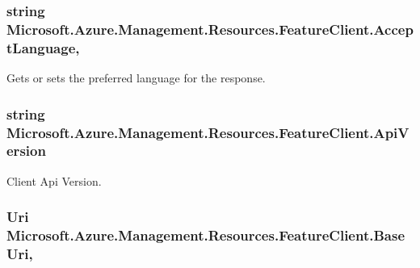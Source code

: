 \subsubsection[{\texorpdfstring{Accept\+Language}{AcceptLanguage}}]{\setlength{\rightskip}{0pt plus 5cm}string Microsoft.\+Azure.\+Management.\+Resources.\+Feature\+Client.\+Accept\+Language\hspace{0.3cm}{\ttfamily [get]}, {\ttfamily [set]}}\hypertarget{class_microsoft_1_1_azure_1_1_management_1_1_resources_1_1_feature_client_a12c737e4db1139025734fddc6e609dbd}{}\label{class_microsoft_1_1_azure_1_1_management_1_1_resources_1_1_feature_client_a12c737e4db1139025734fddc6e609dbd}


Gets or sets the preferred language for the response. 

\subsubsection[{\texorpdfstring{Api\+Version}{ApiVersion}}]{\setlength{\rightskip}{0pt plus 5cm}string Microsoft.\+Azure.\+Management.\+Resources.\+Feature\+Client.\+Api\+Version\hspace{0.3cm}{\ttfamily [get]}}\hypertarget{class_microsoft_1_1_azure_1_1_management_1_1_resources_1_1_feature_client_ab9ec640be2a72809c8d0fbf59f9601e9}{}\label{class_microsoft_1_1_azure_1_1_management_1_1_resources_1_1_feature_client_ab9ec640be2a72809c8d0fbf59f9601e9}


Client Api Version. 

\subsubsection[{\texorpdfstring{Base\+Uri}{BaseUri}}]{\setlength{\rightskip}{0pt plus 5cm}Uri Microsoft.\+Azure.\+Management.\+Resources.\+Feature\+Client.\+Base\+Uri\hspace{0.3cm}{\ttfamily [get]}, {\ttfamily [set]}}\hypertarget{class_microsoft_1_1_azure_1_1_management_1_1_resources_1_1_feature_client_afada16c589e422353970ff4a284e9d27}{}\label{class_microsoft_1_1_azure_1_1_management_1_1_resources_1_1_feature_client_afada16c589e422353970ff4a284e9d27}



